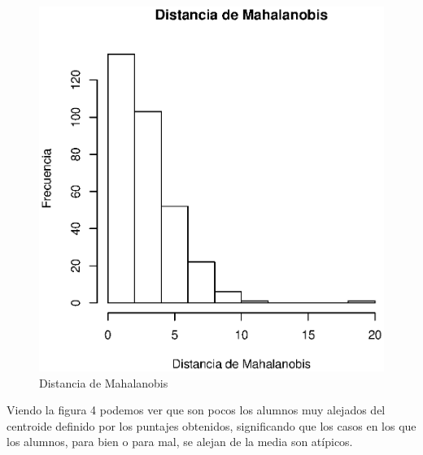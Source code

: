 \documentclass{article}
\begin{document}
\begin{figure}[H]
    \centering
    \includegraphics[scale = 0.9]{Output/Plots/DistanciaMahalanobis.eps}
    \caption{Distancia de Mahalanobis}
\end{figure}

Viendo la figura 4 podemos ver que son pocos los alumnos muy alejados del centroide definido por los puntajes obtenidos,
significando que los casos en los que los alumnos, para bien o para mal, se alejan de la media son at\'ipicos.
\end{document}
